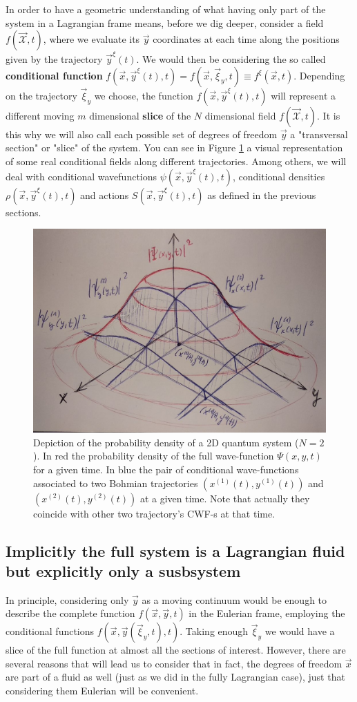 \documentclass[11pt, a4paper]{article} %
\newcommand{\x}{\mathcal{X}}
\begin{document}
In order to have a geometric understanding of what having only part of the system in a Lagrangian frame means, before we dig deeper, consider a field $f(\vec{\x},t)$, where we evaluate its $\vec{y}$ coordinates at each time along the positions given by the trajectory $\vec{y}^\xi(t)$. We would then be considering the so called {\bf conditional function} $f(\vec{x}, \vec{y}^\xi(t),t)=f(\vec{x}, \vec{\xi}_y,t)\equiv f^\xi(\vec{x},t)$. Depending on the trajectory $\vec{\xi}_y$ we choose, the function $f(\vec{x}, \vec{y}^\xi(t),t)$ will represent a different moving   $m$ dimensional {\bf slice} of the $N$ dimensional field $f(\vec{\x},t)$. It is this why we will also call each possible set of degrees of freedom $\vec{y}$ a "transversal section" or "slice" of the system. You can see in Figure \ref{fig:slices} a visual representation of some real conditional fields along different trajectories. Among others, we will deal with conditional wavefunctions $\psi(\vec{x}, \vec{y}^\xi(t),t)$, conditional densities $\rho(\vec{x}, \vec{y}^\xi(t),t)$ and actions $S(\vec{x}, \vec{y}^\xi(t),t)$ as defined in the previous sections.


\begin{figure}[h!]
  \centering
    \includegraphics[width=0.65\linewidth]{slices.jpg}
  \caption{Depiction of the probability density of a 2D quantum system ($N=2$). In red the probability density of the full wave-function $\Psi(x,y,t)$ for a given time. In blue the pair of conditional wave-functions associated to two Bohmian trajectories $(x^{(1)}(t),y^{(1)}(t))$ and $(x^{(2)}(t),y^{(2)}(t))$ at a given time. Note that actually they coincide with other two trajectory's CWF-s at that time. }
  \label{fig:slices}
\end{figure}


\subsection*{Implicitly the full system is a Lagrangian fluid but explicitly only a susbsystem}
In principle, considering only $\vec{y}$ as a moving continuum would be enough to describe the complete function $f(\vec{x},\vec{y},t)$ in the Eulerian frame, employing the conditional functions $f(\vec{x},\vec{y}(\vec{\xi}_y,t),t)$. Taking enough $\vec{\xi}_y$ we would have a slice of the full function at almost all the sections of interest. However, there are several reasons that will lead us to consider that in fact, the degrees of freedom $\vec{x}$ are part of a fluid as well (just as we did in the fully Lagrangian case), just that considering them Eulerian will be convenient.
\end{document}
